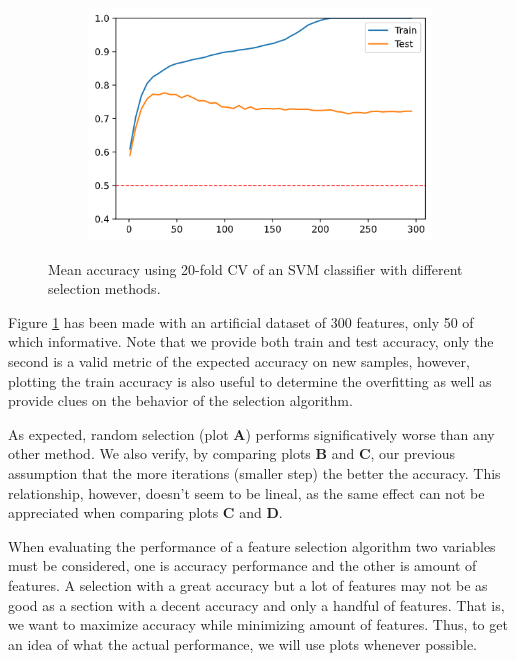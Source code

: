 \begin{figure}[h]
\begin{subfigure}[b]{0.4\linewidth}
    \end{subfigure}
    \begin{subfigure}[b]{0.4\linewidth}
        \includegraphics[width=\linewidth]{img/ch4/vanilla300-svmrfe.png}
    \end{subfigure}
    \caption{Mean accuracy using 20-fold CV of an SVM classifier with different selection methods.}
    \label{fig:ch4.dynamicStep.vanilla.comp}
\end{figure}

Figure \ref{fig:ch4.dynamicStep.vanilla.comp} has been made with an artificial dataset of 300 features, only 50 of which informative. Note that we provide both train and test accuracy, only the second is a valid metric of the expected accuracy on new samples, however, plotting the train accuracy is also useful to determine the overfitting as well as provide clues on the behavior of the selection algorithm.

As expected, random selection (plot \textbf{A}) performs significatively worse than any other method. We also verify, by comparing plots \textbf{B} and \textbf{C}, our previous assumption that the more iterations (smaller step) the better the accuracy. This relationship, however, doesn't seem to be lineal, as the same effect can not be appreciated when comparing plots \textbf{C} and \textbf{D}.

When evaluating the performance of a feature selection algorithm two variables must be considered, one is accuracy performance and the other is amount of features. A selection with a great accuracy but a lot of features may not be as good as a section with a decent accuracy and only a handful of features. That is, we want to maximize accuracy while minimizing amount of features. Thus, to get an idea of what the actual performance, we will use plots whenever possible.

